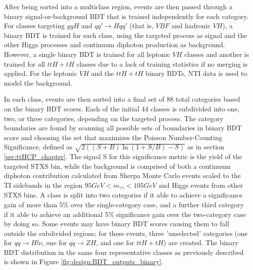 After being sorted into a multiclass region, events are then passed through a binary signal-or-background BDT that is trained independently for each category. For classes targeting $ggH$ and $qq' \rightarrow Hqq'$ (that is, $VBF$ and hadronic $VH$), a binary BDT is trained for each class, using the targeted process as signal and the other Higgs processes and continuum diphoton production as background. However, a single binary BDT is trained for all leptonic $VH$ classes and another is trained for all $ttH+tH$ classes due to a lack of training statistics if no merging is applied. For the leptonic $VH$ and the $ttH+tH$ binary BDTs, NTI data is used to model the background.

In each class, events are then sorted into a final set of 88 total categories based on the binary BDT scores. Each of the initial 44 classes is subdivided into one, two, or three categories, depending on the targeted process. The category boundaries are found by scanning all possible sets of boundaries in binary BDT score and choosing the set that maximizes the Poisson Number-Counting Significance, defined as $\sqrt{2((S+B)\ln(1+S/B)-S)}$ as in section \ref{sec:ttHCP_chapter}. The signal S for this significance metric is the yield of the targeted STXS bin, while the background is comprised of both a continuum diphoton contribution calculated from Sherpa Monte Carlo events scaled to the TI sidebands in the region $95 GeV < m_{\gamma \gamma} < 105 GeV$ and Higgs events from other STXS bins. A class is split into two categories if it able to achieve a significance gain of more than 5\% over the single-category case, and a further third category if it able to achieve an additional 5\% significance gain over the two-category case by doing so. Some events may have binary BDT scores causing them to fall outside the subdivided regions; for these events, three 'unselected' categories (one for $qq \rightarrow H l \nu$, one for $qq \rightarrow ZH$, and one for $ttH+tH$) are created. The binary BDT distribution in the same four representative classes as previously described is shown in Figure \ref{fig:design:BDT_outputs_binary}.


